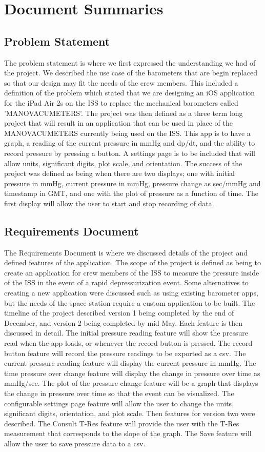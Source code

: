 \documentclass[onecolumn, draftclsnofoot,10pt, compsoc]{IEEEtran}
\begin{document}
\section{Document Summaries}

\subsection{Problem Statement}
The problem statement is where we first expressed the understanding we had of the project.
We described the use case of the barometers that are begin replaced so that our design may fit the needs of the crew members.
This included a definition of the problem which stated that we are designing an iOS application for the iPad Air 2s on the ISS to replace the mechanical barometers called 'MANOVACUMETERS'.
The project was then defined as a three term long project that will result in an application that can be used in place of the MANOVACUMETERS currently being used on the ISS.
This app is to have a graph, a reading of the current pressure in mmHg and dp/dt, and the ability to record pressure by pressing a button.
A settings page is to be included that will allow units, significant digits, plot scale, and orientation.
The success of the project was defined as being when there are two displays; one with initial pressure in mmHg, current pressure in mmHg, pressure change as sec/mmHg and timestamp in GMT, and one with the plot of pressure as a function of time.
The first display will allow the user to start and stop recording of data.

\subsection{Requirements Document}
The Requirements Document is where we discussed details of the project and defined features of the application.
The scope of the project is defined as being to create an application for crew members of the ISS to measure the pressure inside of the ISS in the event of a rapid depressurization event.
Some alternatives to creating a new application were discussed such as using existing barometer apps, but the needs of the space station require a custom application to be built.
The timeline of the project described version 1 being completed by the end of December, and version 2 being completed by mid May.
Each feature is then discussed in detail.
The initial pressure reading feature will show the pressure read when the app loads, or whenever the record button is pressed.
The record button feature will record the pressure readings to be exported as a csv.
The current pressure reading feature will display the current pressure in mmHg.
The time pressure over change feature will display the change in pressure over time as mmHg/sec.
The plot of the pressure change feature will be a graph that displays the change in pressure over time so that the event can be visualized.
The configurable settings page feature will allow the user to change the units, significant digits, orientation, and plot scale.
Then features for version two were described.
The Consult T-Res feature will provide the user with the T-Res measurement that  corresponds to the slope of the graph.
The Save feature will allow the user to save pressure data to a csv.
\end{document}
